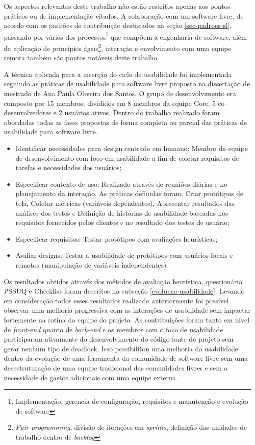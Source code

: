 Os aspectos relevantes deste trabalho não estão restritos apenas aos  pontos práticos ou de implementação citados. A colaboração com um software livre, de acordo com os padrões de contribuição destacados na seção \ref{sec-padroes-sl}, passando por vários dos processos\footnote{Implementação, gerencia de configuração, requisitos e manutenção e evolução de software} que compõem a engenharia de software, além da aplicação de princípios ágeis\footnote{\textit{Pair programming}, divisão de iterações em \textit{sprints}, definição das unidades de trabalho dentro de \textit{backlog}}, interação e envolvimento com uma equipe remota também são pontos notáveis deste trabalho.

%
A técnica aplicada para a inserção do ciclo de usabilidade foi implementada seguindo as práticas de usabilidade para software livre proposto na dissertação de mestrado de Ana Paula Oliveira dos Santos. O grupo de desenvolvimento era composto por 15 membros, divididos em 8 membros da equipe Core, 5 co-desenvolvedores e 2 usuários ativos. Dentro do trabalho realizado foram abordadas todas as fases propostas de forma completa ou parcial das práticas de usabilidade para software livre.

\begin{itemize}
\item Identificar necessidades para design centrado em humano: Membro da equipe de desenvolvimento com foco em usabilidade a fim de coletar requisitos de tarefas e necessidades dos usuários;
\item Especificar contexto de uso: Realizado através de reuniões diárias e no planejamento da interação. As práticas definidas foram: Criar protótipos de tela, Coletar métricas (variáveis dependentes), Apresentar resultados das análises dos testes e Definição de histórias de usabilidade baseadas nos requisitos fornecidos pelos clientes
e no resultado dos testes de usuário;
\item Especificar requisitos: Testar protótipos com avaliações heurísticas;
\item Avaliar designs: Testar a usabilidade de protótipos com usuários locais e remotos (manipulação de variáveis independentes)
\end{itemize}

Os resultados obtidos através dos métodos de avaliação heurística, questionário PSSUQ e Checklist foram descritos na subseção \ref{evolucao-usabilidade}. Levando em consideração todos esses resultados realizado anteriormente foi possível observar uma melhoria progressiva com as interações de usabilidade sem impactar fortemente na rotina da equipe do projeto. As contribuições foram tanto em nível de \textit{front-end} quanto de \textit{back-end} e os membros com o foco de usabilidade participaram ativamente do desenvolvimento do código-fonte do projeto sem gerar nenhum tipo de deadlock. Isso possibilitou uma melhoria da usabilidade dentro da evolução de uma ferramenta da comunidade de software livre sem uma desestruturação de uma equipe tradicional das comunidades livres e sem a necessidade de gastos adicionais com uma equipe externa.  

